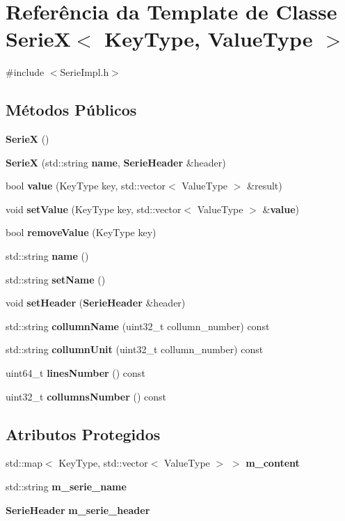 \section{Referência da Template de Classe SerieX$<$ Key\+Type, Value\+Type $>$}
\label{class_serie_x}


{\ttfamily \#include $<$Serie\+Impl.\+h$>$}

\subsection*{Métodos Públicos}
\begin{DoxyCompactItemize}
\item 
{\bf SerieX} ()
\item 
{\bf SerieX} (std\+::string {\bf name}, {\bf Serie\+Header} \&header)
\item 
bool {\bf value} (Key\+Type key, std\+::vector$<$ Value\+Type $>$ \&result)
\item 
void {\bf set\+Value} (Key\+Type key, std\+::vector$<$ Value\+Type $>$ \&{\bf value})
\item 
bool {\bf remove\+Value} (Key\+Type key)
\item 
std\+::string {\bf name} ()
\item 
std\+::string {\bf set\+Name} ()
\item 
void {\bf set\+Header} ({\bf Serie\+Header} \&header)
\item 
std\+::string {\bf collumn\+Name} (uint32\+\_\+t collumn\+\_\+number) const 
\item 
std\+::string {\bf collumn\+Unit} (uint32\+\_\+t collumn\+\_\+number) const 
\item 
uint64\+\_\+t {\bf lines\+Number} () const 
\item 
uint32\+\_\+t {\bf collumns\+Number} () const 
\end{DoxyCompactItemize}
\subsection*{Atributos Protegidos}
\begin{DoxyCompactItemize}
\item 
std\+::map$<$ Key\+Type, std\+::vector$<$ Value\+Type $>$ $>$ {\bf m\+\_\+content}
\item 
std\+::string {\bf m\+\_\+serie\+\_\+name}
\item 
{\bf Serie\+Header} {\bf m\+\_\+serie\+\_\+header}
\end{DoxyCompactItemize}


